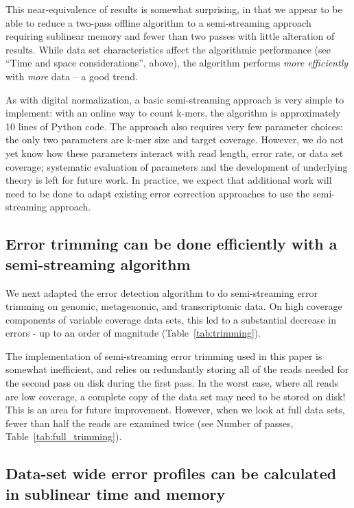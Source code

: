 \documentclass{article}
\begin{document}
This near-equivalence of results is somewhat surprising, in that we
appear to be able to reduce a two-pass offline algorithm to a
semi-streaming approach requiring sublinear memory and fewer than two
passes with little alteration of results.  While data set
characteristics affect the algorithmic performance (see ``Time and
space considerations'', above), the algorithm performs {\em more
  efficiently} with {\em more} data -- a good trend.

As with digital normalization, a basic semi-streaming approach is very
simple to implement: with an online way to count k-mers, the algorithm
is approximately 10 lines of Python code.  The approach also requires
very few parameter choices: the only two parameters are k-mer size and
target coverage.  However, we do not yet know how these parameters
interact with read length, error rate, or data set coverage;
systematic evaluation of parameters and the development of underlying
theory is left for future work.  In practice, we expect that
additional work will need to be done to adapt existing error
correction approaches to use the semi-streaming approach.

\subsection{Error trimming can be done efficiently with a semi-streaming algorithm}

We next adapted the error detection algorithm to do semi-streaming
error trimming on genomic, metagenomic, and transcriptomic data.  On
high coverage components of variable coverage data sets, this led to a
substantial decrease in errors - up to an order of magnitude
(Table~\ref{tab:trimming}).

The implementation of semi-streaming error trimming used in this paper is
somewhat inefficient, and relies on redundantly storing all of the
reads needed for the second pass on disk during the first pass.  In
the worst case, where all reads are low coverage, a complete copy of
the data set may need to be stored on disk!  This is an area for
future improvement.  However, when we look at full data sets, fewer
than half the reads are examined twice (see Number of passes,
Table~\ref{tab:full_trimming}).

\subsection{Data-set wide error profiles can be calculated in sublinear time and memory}
\end{document}
